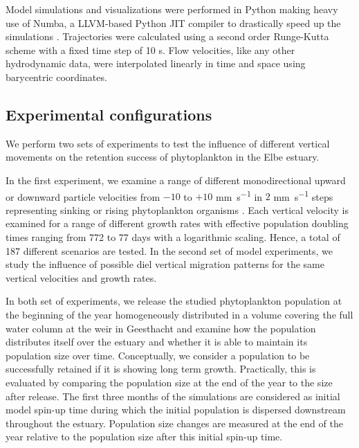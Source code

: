 \documentclass[npg, manuscript]{copernicus}
\begin{document}
Model simulations and visualizations were performed in Python making heavy use of Numba, a LLVM-based Python JIT compiler \citep{Lam2015} to drastically speed up the simulations \citep{Vennell2021}.
Trajectories were calculated using a second order Runge-Kutta scheme with a fixed time step of 10 \unit{s}.
Flow velocities, like any other hydrodynamic data, were interpolated linearly in time and space using barycentric coordinates.

\subsection{Experimental configurations}

We perform two sets of experiments to test the influence of different vertical movements on the retention success of phytoplankton in the Elbe estuary.

In the first experiment, we examine a range of different monodirectional upward or downward particle velocities from $-10$ to $+10$ \unit{mm s^{-1}} in $2$ \unit{mm s^{-1}} steps representing sinking or rising phytoplankton organisms \citep{Fennessy1996}.
Each vertical velocity is examined for a range of different growth rates with effective population doubling times ranging from 772 to 77 days with a logarithmic scaling.
Hence, a total of 187 different scenarios are tested.
In the second set of model experiments, we study the influence of possible diel vertical migration patterns for the same vertical velocities and growth rates.

In both set of experiments, we release the studied phytoplankton population at the beginning of the year homogeneously distributed in a volume covering the full water column at the weir in Geesthacht and examine how the population distributes itself over the estuary and whether it is able to maintain its population size over time.
Conceptually, we consider a population to be successfully retained if it is showing long term growth. 
Practically, this is evaluated by comparing the population size at the end of the year to the size after release.
The first three months of the simulations are considered as initial model spin-up time during which the initial population is dispersed downstream throughout the estuary.
Population size changes are measured at the end of the year relative to the population size after this initial spin-up time.
\end{document}
